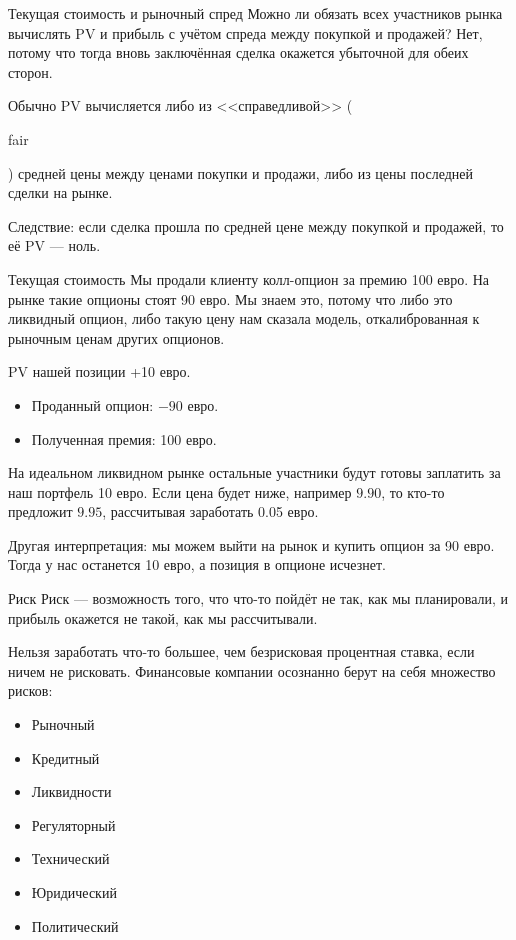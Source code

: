 \documentclass{beamer}
\newcommand{\en}[1]{\begin{otherlanguage}{english}#1\end{otherlanguage}}
\begin{document}
\begin{frame}{Текущая стоимость и рыночный спред}
\justify
Можно ли обязать всех участников рынка вычислять PV и прибыль с учётом спреда между покупкой и продажей? Нет, потому что тогда вновь заключённая сделка окажется убыточной для обеих сторон.

\justify
Обычно PV вычисляется либо из <<справедливой>> (\en{fair}) средней цены между ценами покупки и продажи, либо из цены последней сделки на рынке. 

\justify
Следствие: если сделка прошла по средней цене между покупкой и продажей, то её PV --- ноль.
\end{frame}



\begin{frame}{Текущая стоимость}
\justify
Мы продали клиенту колл-опцион за премию 100 евро. На рынке такие опционы стоят 90 евро.  
Мы знаем это, потому что либо это ликвидный опцион, либо такую цену нам сказала модель, 
откалиброванная к рыночным ценам других опционов.

\justify
PV нашей позиции +10 евро.
\begin{itemize}
\item Проданный опцион: $-90$ евро.
\item Полученная премия: 100 евро.
\end{itemize}

\justify
На идеальном ликвидном рынке остальные участники будут готовы заплатить за наш портфель 
10 евро. Если цена будет ниже, например $9.90$, то кто-то предложит $9.95$, рассчитывая 
заработать 0.05 евро.

\justify
Другая интерпретация: мы можем выйти на рынок и купить опцион за 90 евро. Тогда у нас 
останется 10 евро, а позиция в опционе исчезнет. 
\end{frame}



\begin{frame}{Риск}
\justify
Риск --- возможность того, что что-то пойдёт не так, как мы планировали, и 	прибыль окажется не такой, как мы рассчитывали.

\justify
Нельзя заработать что-то большее, чем безрисковая процентная ставка, если ничем не рисковать. Финансовые компании осознанно берут на себя множество рисков:
\begin{itemize}
\item Рыночный
\item Кредитный
\item Ликвидности
\item Регуляторный
\item Технический
\item Юридический
\item Политический
\end{itemize}
\end{frame}
\end{document}
